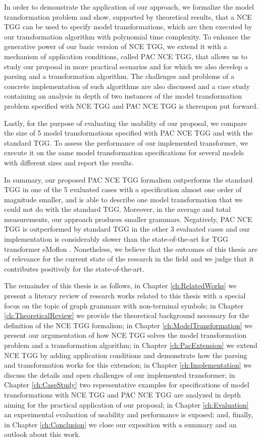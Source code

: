 In order to demonstrate the application of our approach, we formalize the model transformation problem and show, supported by theoretical results, that a NCE TGG can be used to specify model transformations, which are then executed by our transformation algorithm with polynomial time complexity. To enhance the generative power of our basic version of NCE TGG, we extend it with a mechanism of application conditions, called PAC NCE TGG, that allows us to study our proposal in more practical scenarios and for which we also develop a parsing and a transformation algorithm. The challenges and problems of a concrete implementation of such algorithms are also discussed and a case study containing an analysis in depth of two instances of the model transformation problem specified with NCE TGG and PAC NCE TGG is thereupon put forward.

Lastly, for the purpose of evaluating the usability of our proposal, we compare the size of 5 model transformations specified with PAC NCE TGG and with the standard TGG. To assess the performance of our implemented transformer, we execute it on the same model transformation specifications for several models with different sizes and report the results.

In summary, our proposed PAC NCE TGG formalism outperforms the standard TGG in one of the 5 evaluated cases with a specification almost one order of magnitude smaller, and is able to describe one model transformation that we could not do with the standard TGG. Moreover, in the average and total measurements, our approach produces smaller grammars. Negatively, PAC NCE TGG is outperformed by standard TGG in the other 3 evaluated cases and our implementation is considerably slower than the state-of-the-art for TGG transformer eMoflon \cite{leblebici2014developing}. Nonetheless, we believe that the outcomes of this thesis are of relevance for the current state of the research in the field and we judge that it contributes positively for the state-of-the-art.

The remainder of this thesis is as follows, in Chapter \ref{ch:RelatedWorks} we present a literary review of research works related to this thesis with a special focus on the topic of graph grammars with non-terminal symbols; in Chapter \ref{ch:TheoreticalReview} we provide the theoretical background necessary for the definition of the NCE TGG formalism; in Chapter \ref{ch:ModelTransformation} we present our argumentation of how NCE TGG solves the model transformation problem and a transformation algorithm; in Chapter \ref{ch:PacExtension} we extend NCE TGG by adding application conditions and demonstrate how the parsing and transformation works for this extension; in Chapter \ref{ch:Implementation} we discuss the details and open challenges of our implemented transformer; in Chapter \ref{ch:CaseStudy} two representative examples for specifications of model transformations with NCE TGG and PAC NCE TGG are analyzed in depth aiming for the practical application of our proposal; in Chapter \ref{ch:Evaluation} an experimental evaluation of usability and performance is exposed; and, finally, in Chapter \ref{ch:Conclusion} we close our exposition with a summary and an outlook about this work.
